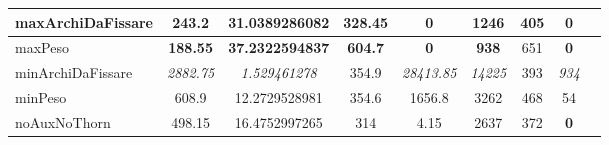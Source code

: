 \begin{table}
\begin{tabular}{l|c|c|c|c|c|c|c|c}
\rowcolor[HTML]{EFEFEF} 
maxArchiDaFissare   & 243.2                & 31.0389286082                                                    & 328.45                                                                      & \textbf{0}                                                                 & 1246                                                                 & 405                                                                     & \textbf{0}                                                             \\ \hline
maxPeso             & \textbf{188.55}      & \textbf{37.2322594837}                                           & \textbf{604.7}                                                              & \textbf{0}                                                                 & \textbf{938}                                                       & 651                                                                     & \textbf{0}                                                             \\ \hline
\rowcolor[HTML]{EFEFEF} 
minArchiDaFissare   & \textit{2882.75}     & \textit{1.529461278}                                             & 354.9                                                                       & \textit{28413.85}                                                          & \textit{14225}                                               & 393                                                                     & \textit{934}                                                           \\ \hline
minPeso             & 608.9                & 12.2729528981                                                    & 354.6                                                                       & 1656.8                                                                     & 3262                                                                 & 468                                                                     & 54                                                                     \\ \hline
\rowcolor[HTML]{EFEFEF} 
noAuxNoThorn        & 498.15               & 16.4752997265                                                    & 314                                                                         & 4.15                                                                       & 2637                                                                 & 372                                                                     & \textbf{0}                                                             \\ \hline

\end{tabular}
\end{table}
